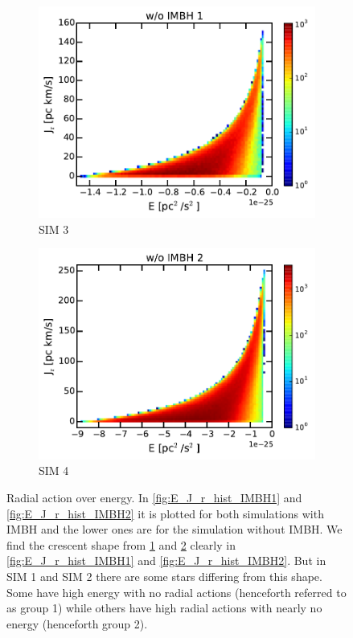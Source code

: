 \begin{figure}[htbp]
\begin{subfigure}{0.475\textwidth}
		\includegraphics[width=\textwidth]{Plots/E_J_r_hist_noIMBH1.pdf}
		\caption{SIM 3}
		\label{fig:E_J_r_hist_noIMBH1}
	\end{subfigure}
	\hfill
	\begin{subfigure}{0.475\textwidth}
		\includegraphics[width=\textwidth]{Plots/E_J_r_hist_noIMBH2.pdf}
		\caption{SIM 4}
		\label{fig:E_J_r_hist_noIMBH2}
	\end{subfigure}
	\caption{Radial action over energy. In \ref{fig:E_J_r_hist_IMBH1} and \ref{fig:E_J_r_hist_IMBH2} it is plotted for both simulations with \ac{IMBH} and the lower ones are for the simulation without \ac{IMBH}. We find the crescent shape from \ref{fig:E_J_r_hist_noIMBH1} and \ref{fig:E_J_r_hist_noIMBH2} clearly in \ref{fig:E_J_r_hist_IMBH1} and \ref{fig:E_J_r_hist_IMBH2}. But in SIM 1 and SIM 2 there are some stars differing from this shape. Some have high energy with no radial actions (henceforth referred to as group 1) while others have high radial actions with nearly no energy (henceforth group 2).}
	\label{fig:E_J_r_hist}
\end{figure}	
